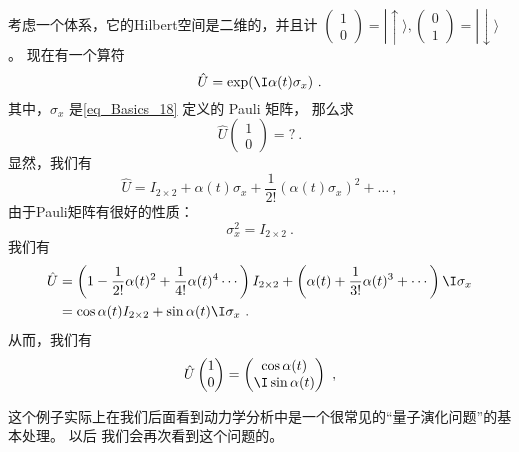 \begin{exercise}{}
考虑一个体系，它的Hilbert空间是二维的，并且计 $\left(\begin{matrix}1 \\0\end{matrix}\right) = |\!\uparrow\rangle, \left(\begin{matrix}0 \\1\end{matrix}\right) = |\!\downarrow\rangle$。 现在有一个算符
\begin{equation}
\hat{U} = \exp(\I\alpha(t) \sigma_x)~.
\end{equation}
其中，$\sigma_x$ 是\autoref{eq_Basics_18} 定义的 Pauli 矩阵， 那么求
\begin{equation}
\hat{U} \left(\begin{matrix}1 \\0\end{matrix}\right) = ? ~.
\end{equation}
显然，我们有
\begin{equation}
\hat U= I_{2\times2} + \alpha(t) \sigma_x + \frac{1}{2!}\left(\alpha(t) \sigma_x\right)^2 + \dots~,
\end{equation}
由于Pauli矩阵有很好的性质：
\begin{equation}
\sigma_x^2 = I_{2\times2}~.
\end{equation}
我们有
\begin{equation}
\begin{split}\hat U &= \left(1 - \frac{1}{2!}\alpha(t)^2 + \frac{1}{4!}\alpha(t)^4  \cdots\right)  I_{2\times2} + \left(\alpha(t) + \frac{1}{3!}\alpha(t)^3 + \cdots \right)\I \sigma_x\\
& = \cos\alpha(t) I_{2\times2} + \sin\alpha(t) \I\sigma_x ~.
\end{split}
\end{equation}
从而，我们有
\begin{equation}
\hat U \left(\begin{matrix}1 \\0\end{matrix}\right)  =  \left(\begin{matrix}\cos\alpha(t) \\ \I \sin\alpha(t)\end{matrix}\right)~,
\end{equation}

这个例子实际上在我们后面看到动力学分析中是一个很常见的``量子演化问题''的基本处理。 以后%
我们会再次看到这个问题的。
\end{exercise}

